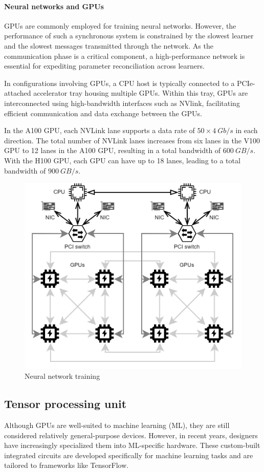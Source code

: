 \paragraph*{Neural networks and GPUs}
GPUs are commonly employed for training neural networks. 
However, the performance of such a synchronous system is constrained by the slowest learner and the slowest messages transmitted through the network. 
As the communication phase is a critical component, a high-performance network is essential for expediting parameter reconciliation across learners.

In configurations involving GPUs, a CPU host is typically connected to a PCIe-attached accelerator tray housing multiple GPUs. 
Within this tray, GPUs are interconnected using high-bandwidth interfaces such as NVlink, facilitating efficient communication and data exchange between the GPUs.

In the A100 GPU, each NVLink lane supports a data rate of $50 \times 4\:Gb/s$ in each direction. 
The total number of NVLink lanes increases from six lanes in the V100 GPU to 12 lanes in the A100 GPU, resulting in a total bandwidth of $600\:GB/s$. 
With the H100 GPU, each GPU can have up to 18 lanes, leading to a total bandwidth of $900\:GB/s$.
\begin{figure}[H]
    \centering
    \includegraphics[width=0.75\linewidth]{images/nnt.png}
    \caption{Neural network training}
\end{figure}

\subsection{Tensor processing unit}
Although GPUs are well-suited to machine learning (ML), they are still considered relatively general-purpose devices. 
However, in recent years, designers have increasingly specialized them into ML-specific hardware. 
These custom-built integrated circuits are developed specifically for machine learning tasks and are tailored to frameworks like TensorFlow.


